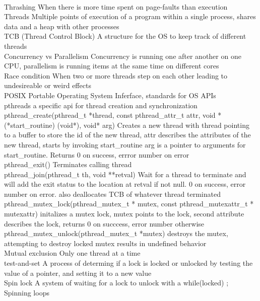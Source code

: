 \documentclass[6pt]{article}
\begin{document}
\\
Thrashing
When there is more time spent on page-faults than execution
\\
Threads
Multiple points of execution of a program within a single process, shares data and a heap with other processes
\\
TCB (Thread Control Block)
A structure for the OS to keep track of different threads
\\
Concurrency vs Parallelism
Concurrency is running one after another on one CPU, parallelism is running items at the same time on different cores
\\
Race condition
When two or more threads step on each other leading to undesireable or weird effects
\\
POSIX
Portable Operating System Inferface, standards for OS APIs
\\
pthreads
a specific api for thread creation and synchronization
\\
pthread\_create(pthread\_t *thread, const pthread\_attr\_t attr, void *(*start\_routine) (void*), void* arg)
Creates a new thread with thread pointing to a buffer to store the id of the new thread, attr describes the attributes of the new thread, starts by invoking start\_routine arg is a pointer to arguments for start\_routine. Returns 0 on success, errror number on error
\\
pthread\_exit()
Terminates calling thread
\\
pthread\_join(pthread\_t th, void **retval)
Wait for a thread to terminate and will add the exit status to the location at retval if not null. 0 on success, error number on error. also deallocates TCB of whatever thread terminated
\\
pthread\_mutex\_lock(pthread\_mutex\_t * mutex, const pthread\_mutexattr\_t * mutexattr)
initalizes a mutex lock, mutex points to the lock, second attribute describes the lock, returns 0 on succcess, error number otherwise
\\
pthread\_mutex\_unlock(pthread\_mutex\_t *mutex)
destroys the mutex, attempting to destroy locked mutex results in undefined behavior
\\
Mutual exclusion
Only one thread at a time
\\
test-and-set
A process of determing if a lock is locked or unlocked by testing the value of a pointer, and setting it to a new value
\\
Spin lock
A system of waiting for a lock to unlock with a while(locked) ;
\\
Spinning loops
\end{document}
